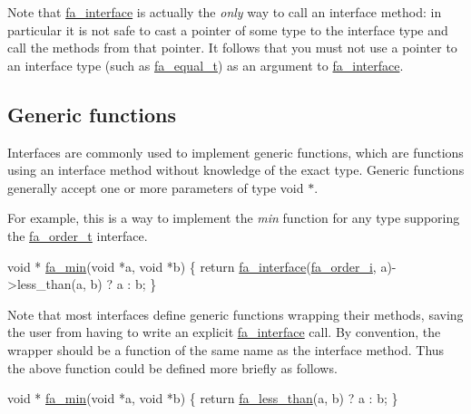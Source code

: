 Note that \hyperlink{group___fa_ga1cc4276643f3d366681ac7ff71fa8b06}{fa\-\_\-interface} is actually the {\itshape only} way to call an interface method\-: in particular it is not safe to cast a pointer of some type to the interface type and call the methods from that pointer. It follows that you must not use a pointer to an interface type (such as \hyperlink{structfa__equal__t}{fa\-\_\-equal\-\_\-t}) as an argument to \hyperlink{group___fa_ga1cc4276643f3d366681ac7ff71fa8b06}{fa\-\_\-interface}.\hypertarget{md__interfaces_GenericFunctions}{}\subsection{Generic functions}\label{md__interfaces_GenericFunctions}
Interfaces are commonly used to implement generic functions, which are functions using an interface method without knowledge of the exact type. Generic functions generally accept one or more parameters of type {\ttfamily void $\ast$}.

For example, this is a way to implement the {\itshape min} function for any type supporing the \hyperlink{structfa__order__t}{fa\-\_\-order\-\_\-t} interface.


\begin{DoxyCode}
\textcolor{keywordtype}{void} * \hyperlink{group___fa_ga81600d57c9bde20b7e9be906b1b37447}{fa\_min}(\textcolor{keywordtype}{void} *a, \textcolor{keywordtype}{void} *b) 
\{             
    \textcolor{keywordflow}{return} \hyperlink{group___fa_ga1cc4276643f3d366681ac7ff71fa8b06}{fa\_interface}(\hyperlink{interfaces_8h_a7c337b4de759549a84c656770ce01cd2ae08a92558a44d2796dc2a5df8ff1b3c3}{fa\_order\_i}, a)->less\_than(a, b) ? a : b;
\}
\end{DoxyCode}


Note that most interfaces define generic functions wrapping their methods, saving the user from having to write an explicit \hyperlink{group___fa_ga1cc4276643f3d366681ac7ff71fa8b06}{fa\-\_\-interface} call. By convention, the wrapper should be a function of the same name as the interface method. Thus the above function could be defined more briefly as follows.


\begin{DoxyCode}
\textcolor{keywordtype}{void} * \hyperlink{group___fa_ga81600d57c9bde20b7e9be906b1b37447}{fa\_min}(\textcolor{keywordtype}{void} *a, \textcolor{keywordtype}{void} *b)
\{
    \textcolor{keywordflow}{return} \hyperlink{group___fa_ga4747e94dca95afaf031d6b00c36cc8fc}{fa\_less\_than}(a, b) ? a : b;
\}
\end{DoxyCode}


